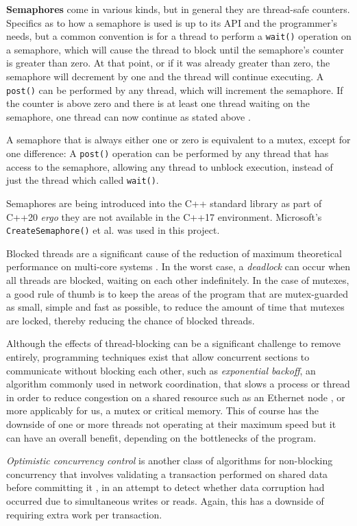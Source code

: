 \documentclass[11pt, a4paper, twocolumn]{article}
\begin{document}
\textbf{Semaphores} come in various kinds, but in general they are thread-safe counters. Specifics as to how a semaphore is used is up to its API and the programmer's needs, but a common convention is for a thread to perform a \verb|wait()| operation on a semaphore, which will cause the thread to block until the semaphore's counter is greater than zero. At that point, or if it was already greater than zero, the semaphore will decrement by one and the thread will continue executing. A \verb|post()| can be performed by any thread, which will increment the semaphore. If the counter is above zero and there is at least one thread waiting on the semaphore, one thread can now continue as stated above \citep{BoostSync}.

A semaphore that is always either one or zero is equivalent to a mutex, except for one difference: A \verb|post()| operation can be performed by any thread that has access to the semaphore, allowing any thread to unblock execution, instead of just the thread which called \verb|wait()|.

Semaphores are being introduced into the C++ standard library as part of C++20 \citep{C20Sync} \emph{ergo} they are not available in the C++17 environment. Microsoft's \verb|CreateSemaphore()| et al. \citep{MicrosoftSemaphore} was used in this project.

Blocked threads are a significant cause of the reduction of maximum theoretical performance on multi-core systems \citep{Alemany1992}. In the worst case, a \emph{deadlock} can occur when all threads are blocked, waiting on each other indefinitely. In the case of mutexes, a good rule of thumb is to keep the areas of the program that are mutex-guarded as small, simple and fast as possible, to reduce the amount of time that mutexes are locked, thereby reducing the chance of blocked threads.

Although the effects of thread-blocking can be a significant challenge to remove entirely, programming techniques exist that allow concurrent sections to communicate without blocking each other, such as \emph{exponential backoff}, an algorithm commonly used in network coordination, that slows a process or thread in order to reduce congestion on a shared resource such as an Ethernet node \citep{Goodman2019}, or more applicably for us, a mutex or critical memory. This of course has the downside of one or more threads not operating at their maximum speed but it can have an overall benefit, depending on the bottlenecks of the program.

\emph{Optimistic concurrency control} is another class of algorithms for non-blocking concurrency that involves validating a transaction performed on shared data before committing it \citep{Herlihy1993}, in an attempt to detect whether data corruption had occurred due to simultaneous writes or reads. Again, this has a downside of requiring extra work per transaction.
\end{document}
